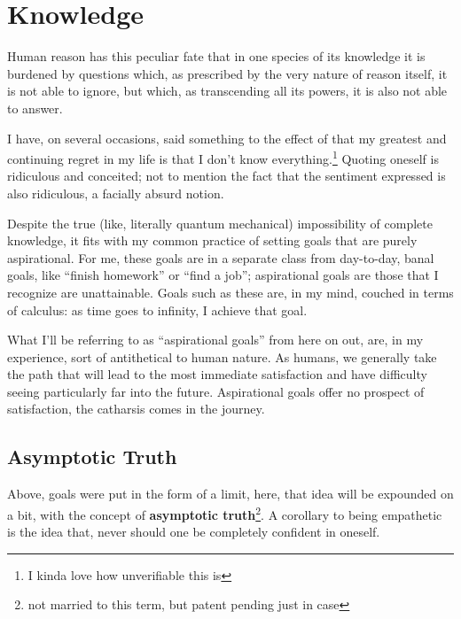 \documentclass[../butidigress.tex]{subfiles}
\begin{document}
\chapter{Knowledge}
\epigraph{Human reason has this peculiar fate that in one species of its knowledge it is burdened by questions which, as prescribed by the very nature of reason itself, it is not able to ignore, but which, as transcending all its powers, it is also not able to answer.}{}
\newpage

I have, on several occasions, said something to the effect of that my greatest and continuing regret in my life is that I don't know everything.\footnote{I kinda love how unverifiable this is}
Quoting oneself is ridiculous and conceited; not to mention the fact that the sentiment expressed is also ridiculous, a facially absurd notion.

Despite the true (like, literally quantum mechanical) impossibility of complete knowledge, it fits with my common practice of setting goals that are purely aspirational.
For me, these goals are in a separate class from day-to-day, banal goals, like ``finish homework'' or ``find a job''; aspirational goals are those that I recognize are unattainable.
Goals such as these are, in my mind, couched in terms of calculus: as time goes to infinity, I achieve that goal.

What I'll be referring to as ``aspirational goals'' from here on out, are, in my experience, sort of antithetical to human nature.
As humans, we generally take the path that will lead to the most immediate satisfaction and have difficulty seeing particularly far into the future.
Aspirational goals offer no prospect of satisfaction, the catharsis comes in the journey.

\section{Asymptotic Truth}
Above, goals were put in the form of a limit, here, that idea will be expounded on a bit, with the concept of \textbf{asymptotic truth}\footnote{not married to this term, but patent pending just in case}.
A corollary to being empathetic is the idea that, never should one be completely confident in oneself.
\end{document}
